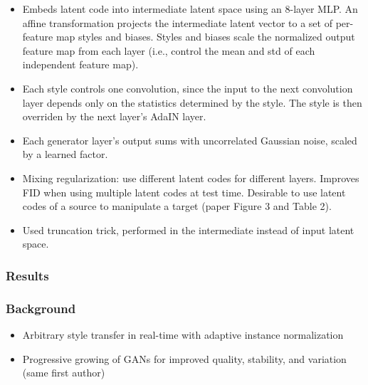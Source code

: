 \documentclass[a4paper, 12pt]{article}
\begin{document}
\begin{itemize}
        \item Embeds latent code into intermediate latent space using an
                8-layer MLP.
                An affine transformation projects the intermediate latent
                vector to a set of per-feature map styles and biases.
                Styles and biases scale the normalized output feature map from
                each layer (i.e., control the mean and std of each independent
                feature map).

        \item Each style controls one convolution, since the input to the next
                convolution layer depends only on the statistics determined by
                the style.
                The style is then overriden by the next layer's AdaIN layer.

        \item Each generator layer's output sums with uncorrelated Gaussian
                noise, scaled by a learned factor.

        \item Mixing regularization: use different latent codes for different
                layers.
                Improves FID when using multiple latent codes at test time.
                Desirable to use latent codes of a source to manipulate a
                target (paper Figure 3 and Table 2).

        \item Used truncation trick, performed in the intermediate instead of
                input latent space.
\end{itemize}


\subsubsection{Results}


\subsubsection{Background}

\begin{itemize}
        \item Arbitrary style transfer in real-time with adaptive instance normalization

        \item Progressive growing of GANs for improved quality, stability, and
                variation (same first author)
\end{itemize}
\end{document}
